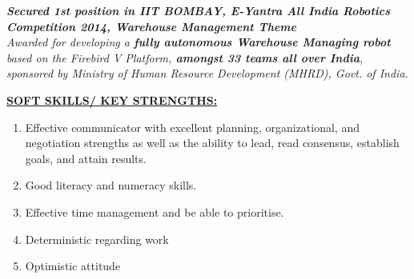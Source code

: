\documentclass{article}
\begin{document}
				\begin{center}
					\emph{\textbf{Secured 1st position in IIT BOMBAY, E-Yantra All India Robotics Competition 2014, Warehouse Management Theme}\\
						Awarded for developing a \textbf{fully autonomous Warehouse Managing robot} based on the Firebird V Platform, \textbf{amongst 33 teams all over India}, sponsored by Ministry of Human Resource Development (MHRD), Govt. of India.}
					\\[\baselineskip]
				\end{center}
				\underline{\textbf{SOFT SKILLS/ KEY STRENGTHS:}}\\
				\begin{enumerate}
					\item Effective communicator with excellent planning, organizational, and negotiation strengths as well as the ability to lead, read consensus, establish goals, and attain results.
					\item Good literacy and numeracy skills.
					\item Effective time management and be able to prioritise.
					\item Deterministic regarding work
					\item Optimistic attitude
					\\[\baselineskip]
				\end{enumerate}
			
\end{document}
